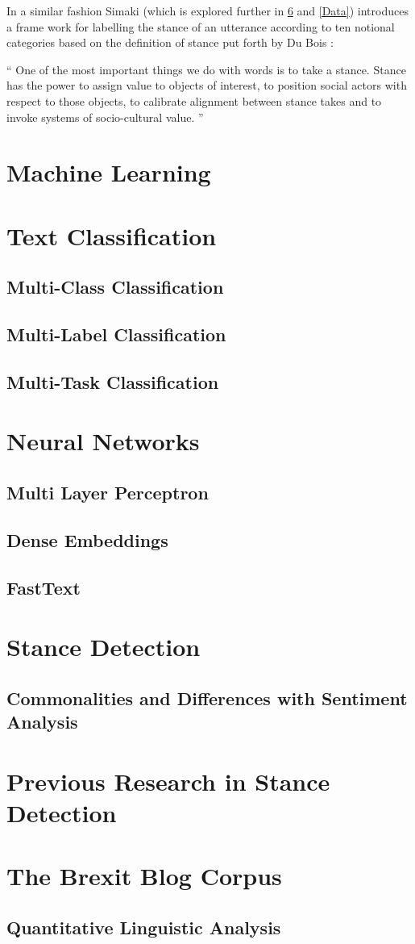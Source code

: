 \documentclass[Dissertation.tex]{subfiles}
\begin{document}
In a similar fashion Simaki \cite{simakiAnnotatingSpeakerStance2017} (which is explored further in \ref{BBC} and \ref{Data}) introduces a frame work for labelling the stance of an utterance according to ten notional categories based on the definition of stance put forth by Du Bois \cite{duboisStanceTriangle2007}:

\begin{displayquote}
	`` One of the most important things we do with words is to take a stance. Stance has the power to assign value to objects of interest, to position social actors with respect to those objects, to calibrate alignment between stance takes and to invoke systems of socio-cultural value. ''
\end{displayquote}


\section{Machine Learning}

\section{Text Classification}
\subsection{Multi-Class Classification}
\subsection{Multi-Label Classification}
\subsection{Multi-Task Classification}
\section{Neural Networks}
\subsection{Multi Layer Perceptron}
\subsection{Dense Embeddings}
\subsection{FastText}
\section{Stance Detection}\label{stanceDetection}
	
\subsection{Commonalities and Differences with Sentiment Analysis}
\section{Previous Research in Stance Detection}
\section{The Brexit Blog Corpus}\label{BBC}
\subsection{Quantitative Linguistic Analysis}
\end{document}
